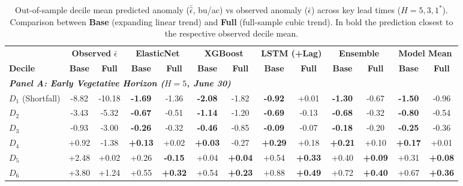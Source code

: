\begin{table}[htbp]
\centering
\singlespacing
\scriptsize
\setlength{\tabcolsep}{2.5pt}
\renewcommand{\arraystretch}{0.96}
\caption{Out-of-sample decile mean predicted anomaly ($\bar{\hat{\epsilon}}$, bu/ac) vs observed anomaly ($\bar{\epsilon}$) across key lead times ($H = 5, 3, 1^*$). Comparison between \textbf{Base} (expanding linear trend) and \textbf{Full} (full-sample cubic trend). In bold the prediction closest to the respective observed decile mean.}
\label{tab:appendix_decile_error_performance}
\begin{tabular*}{\textwidth}{@{\extracolsep{\fill}} l cc cc cc cc cc cc @{}}
\toprule
& \multicolumn{2}{c}{\textbf{Observed } $\bar{\epsilon}$} & \multicolumn{2}{c}{\textbf{ElasticNet}} & \multicolumn{2}{c}{\textbf{XGBoost}} & \multicolumn{2}{c}{\textbf{LSTM (+Lag)}} & \multicolumn{2}{c}{\textbf{Ensemble}} & \multicolumn{2}{c}{\textbf{Model Mean}} \\
\cmidrule(lr){2-3}\cmidrule(lr){4-5}\cmidrule(lr){6-7}\cmidrule(lr){8-9}\cmidrule(lr){10-11}\cmidrule(lr){12-13}
\textbf{Decile} & \textbf{Base} & \textbf{Full} & \textbf{Base} & \textbf{Full} & \textbf{Base} & \textbf{Full} & \textbf{Base} & \textbf{Full} & \textbf{Base} & \textbf{Full} & \textbf{Base} & \textbf{Full} \\
\midrule
\multicolumn{13}{l}{\textit{\textbf{Panel A: Early Vegetative Horizon ($H = 5$, June 30)}}} \\
\midrule
$D_{1}$ (Shortfall) & -8.82 & -10.18 & \textbf{-1.69} & -1.36 & \textbf{-2.08} & -1.82 & \textbf{-0.92} & +0.01 & \textbf{-1.30} & -0.67 & \textbf{-1.50} & -0.96 \\
$D_{2}$ & -3.43 & -5.32 & \textbf{-0.67} & -0.51 & \textbf{-1.14} & -1.20 & \textbf{-0.69} & -0.13 & \textbf{-0.68} & -0.32 & \textbf{-0.80} & -0.54 \\
$D_{3}$ & -0.93 & -3.00 & \textbf{-0.26} & -0.32 & \textbf{-0.46} & -0.85 & \textbf{-0.09} & -0.07 & \textbf{-0.18} & -0.20 & \textbf{-0.25} & -0.36 \\
$D_{4}$ & +0.92 & -1.38 & \textbf{+0.13} & +0.02 & \textbf{+0.03} & -0.27 & \textbf{+0.29} & +0.18 & \textbf{+0.21} & +0.10 & \textbf{+0.17} & +0.01 \\
$D_{5}$ & +2.48 & +0.02 & +0.26 & \textbf{-0.15} & +0.04 & \textbf{+0.04} & +0.54 & \textbf{+0.33} & +0.40 & \textbf{+0.09} & +0.31 & \textbf{+0.08} \\
$D_{6}$ & +3.80 & +1.24 & +0.55 & \textbf{+0.32} & +0.54 & \textbf{+0.23} & +0.88 & \textbf{+0.49} & +0.72 & \textbf{+0.40} & +0.67 & \textbf{+0.36} \\

\end{tabular*}
\end{table}
